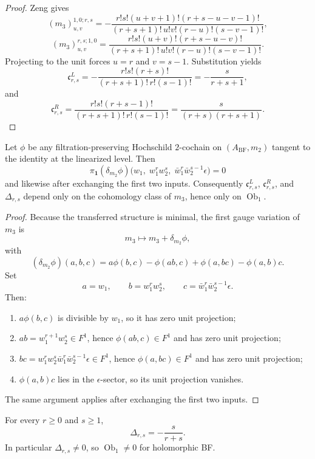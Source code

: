 \begin{proof}
Zeng gives
\[
(m_3)^{1,0;r,s}_{u,v}
= - \frac{r!s!(u+v+1)!(r+s-u-v-1)!}{(r+s+1)!\,u!v!(r-u)!(s-v-1)!},
\]
\[
(m_3)^{r,s;1,0}_{u,v}
= \frac{r!s!(u+v)!(r+s-u-v)!}{(r+s+1)!\,u!v!(r-u)!(s-v-1)!}.
\]
Projecting to the unit forces $u=r$ and $v=s-1$. Substitution yields
\[
\mathfrak c^L_{r,s}=-\frac{r!s!(r+s)!}{(r+s+1)!\,r!(s-1)!}
=-\frac{s}{r+s+1},
\]
and
\[
\mathfrak c^R_{r,s}=\frac{r!s!(r+s-1)!}{(r+s+1)!\,r!(s-1)!}
=\frac{s}{(r+s)(r+s+1)}.
\]
\end{proof}

\begin{theorem}
\label{thm:cbt-unit-projection-gauge-invariant}
\ClaimStatusProvedHere
Let $\phi$ be any filtration-preserving Hochschild $2$-cochain on $(A_{\mathrm{BF}},m_2)$ tangent to the identity at the linearized level. Then
\[
\pi_{\mathbf 1}(\delta_{m_2}\phi)
\bigl(w_1,\;w_1^rw_2^s,\;\bar w_1^r\bar w_2^{s-1}\epsilon\bigr)=0
\]
and likewise after exchanging the first two inputs. Consequently $\mathfrak c^L_{r,s}$, $\mathfrak c^R_{r,s}$, and $\Delta_{r,s}$ depend only on the cohomology class of $m_3$, hence only on $\operatorname{Ob}_1$.
\end{theorem}

\begin{proof}
Because the transferred structure is minimal, the first gauge variation of $m_3$ is
\[
m_3\mapsto m_3+\delta_{m_2}\phi,
\]
with
\[
(\delta_{m_2}\phi)(a,b,c)
=
a\phi(b,c)-\phi(ab,c)+\phi(a,bc)-\phi(a,b)c.
\]
Set
\[
a=w_1,\qquad
b=w_1^rw_2^s,\qquad
c=\bar w_1^r\bar w_2^{s-1}\epsilon.
\]
Then:
\begin{enumerate}[label=\textup{(\arabic*)},leftmargin=2em]
\item $a\phi(b,c)$ is divisible by $w_1$, so it has zero unit projection;
\item $ab=w_1^{r+1}w_2^s\in F^1$, hence $\phi(ab,c)\in F^1$ and has zero unit projection;
\item $bc=w_1^rw_2^s\bar w_1^r\bar w_2^{s-1}\epsilon\in F^1$, hence $\phi(a,bc)\in F^1$ and has zero unit projection;
\item $\phi(a,b)c$ lies in the $\epsilon$-sector, so its unit projection vanishes.
\end{enumerate}
The same argument applies after exchanging the first two inputs.
\end{proof}

\begin{theorem}
\label{thm:cbt-explicit-ob1}
\ClaimStatusProvedHere
For every $r\ge0$ and $s\ge1$,
\[
\Delta_{r,s}=-\frac{s}{r+s}.
\]
In particular $\Delta_{r,s}\neq0$, so $\operatorname{Ob}_1\neq0$ for holomorphic BF.
\end{theorem}

